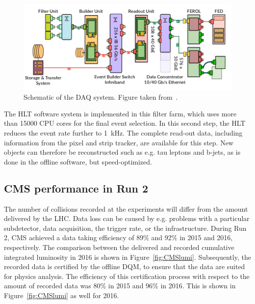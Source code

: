 \begin{figure}[ht]
  \centering
 \includegraphics[width=.9\textwidth]{DAQ}
 \caption{Schematic of the \protect\acf{DAQ} system. Figure taken from~\cite{Andre:2252634}.}
 \label{fig:DAQ}
\end{figure}

The \ac{HLT} software system is implemented in this filter farm, which uses more than \SI{15000}{} CPU cores for the final event selection. In this second step, the \ac{HLT} reduces the event rate further to \SI{1}{kHz}. The complete read-out data, including information from the pixel and strip tracker, are available for this step. New objects can therefore be reconstructed such as e.g. tau leptons and b-jets, as is done in the offline software, but speed-optimized.%

\subsection{CMS performance in Run 2}

The number of collisions recorded at the experiments will differ from the amount delivered by the \ac{LHC}. Data loss can be caused by e.g. problems with a particular subdetector, data acquisition, the trigger rate, or the infrastructure. During Run 2, CMS achieved a data taking efficiency of 89\% and 92\% in 2015 and 2016, respectively. The comparison between the delivered and recorded cumulative integrated luminosity in 2016 is shown in Figure~\ref{fig:CMSlumi}. Subsequently, the recorded data is certified by the offline \ac{DQM}, to ensure that the data are suited for physics analysis. The efficiency of this certification process with respect to the amount of recorded data was 80\% in 2015 and 96\% in 2016. This is shown in Figure~\ref{fig:CMSlumi} as well for 2016.

